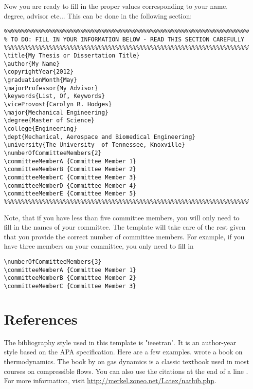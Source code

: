 Now you are ready to fill in the proper values corresponding to your name, degree, advisor etc... This can be done in the following section:
\begin{verbatim}
%%%%%%%%%%%%%%%%%%%%%%%%%%%%%%%%%%%%%%%%%%%%%%%%%%%%%%%%%%%%%%%%%%%%%%%%%%%
% TO DO: FILL IN YOUR INFORMATION BELOW - READ THIS SECTION CAREFULLY
%%%%%%%%%%%%%%%%%%%%%%%%%%%%%%%%%%%%%%%%%%%%%%%%%%%%%%%%%%%%%%%%%%%%%%%%%%%
\title{My Thesis or Dissertation Title}
\author{My Name}
\copyrightYear{2012}
\graduationMonth{May}
\majorProfessor{My Advisor}
\keywords{List, Of, Keywords}
\viceProvost{Carolyn R. Hodges}
\major{Mechanical Engineering}
\degree{Master of Science}
\college{Engineering}
\dept{Mechanical, Aerospace and Biomedical Engineering}
\university{The University  of Tennessee, Knoxville}
\numberOfCommitteeMembers{2}
\committeeMemberA {Committee Member 1}
\committeeMemberB {Committee Member 2}
\committeeMemberC {Committee Member 3}
\committeeMemberD {Committee Member 4}
\committeeMemberE {Committee Member 5}
%%%%%%%%%%%%%%%%%%%%%%%%%%%%%%%%%%%%%%%%%%%%%%%%%%%%%%%%%%%%%%%%%%%%%%%%%%%
\end{verbatim}
Note, that if you have less than five committee members, you will only need to fill in the names of your committee. The template will take care of the rest given that you provide the correct number of committee members. For example, if you have three members on your committee, you only need to fill in
\begin{verbatim}
\numberOfCommitteeMembers{3}
\committeeMemberA {Committee Member 1}
\committeeMemberB {Committee Member 2}
\committeeMemberC {Committee Member 3}
\end{verbatim}

\section{References}
The bibliography style used in this template is "ieeetran". It is an author-year style based on the APA specification. Here are a few examples. \cite{Fermi1956} wrote a book on thermodynamics. The book by \cite{liepmann2001} on gas dynamics is a classic textbook used in most courses on compressible flows. You can also use the citations at the end of a line \citep{Saad2010RSPA,Lamb1895}. For more information, visit \href{http://merkel.zoneo.net/Latex/natbib.php}{http://merkel.zoneo.net/Latex/natbib.php}.

